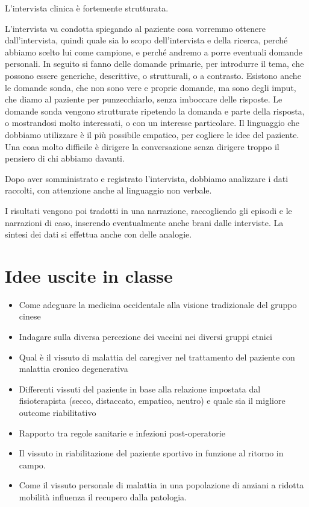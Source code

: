 L'intervista clinica è fortemente strutturata.

L'intervista va condotta spiegando al paziente cosa vorremmo ottenere dall'intervista, quindi quale sia lo scopo dell'intervista e della ricerca, perché abbiamo scelto lui come campione, e perché andremo a porre eventuali domande personali.
In seguito si fanno delle domande primarie, per introdurre il tema, che possono essere generiche, descrittive, o strutturali, o a contrasto. Esistono anche le domande sonda, che non sono vere e proprie domande, ma sono degli imput, che diamo al paziente per punzecchiarlo, senza imboccare delle risposte. Le domande sonda vengono strutturate ripetendo la domanda e parte della risposta, o mostrandosi molto interessati, o con un interesse particolare. Il linguaggio che dobbiamo utilizzare è il più possibile empatico, per cogliere le idee del paziente. Una coaa molto difficile è dirigere la conversazione senza dirigere troppo il pensiero di chi abbiamo davanti.

Dopo aver somministrato e registrato l'intervista, dobbiamo analizzare i dati raccolti, con attenzione anche al linguaggio non verbale.

I risultati vengono poi tradotti in una narrazione, raccogliendo gli episodi e le narrazioni di caso, inserendo eventualmente anche brani dalle interviste. La sintesi dei dati si effettua anche con delle analogie.

\section{Idee uscite in classe}
\begin{itemize}
\item Come adeguare la medicina occidentale alla visione tradizionale del gruppo cinese
\item Indagare sulla diversa percezione dei vaccini nei diversi gruppi etnici
\item Qual è il vissuto di malattia del caregiver nel trattamento del paziente con malattia cronico degenerativa
\item Differenti vissuti del paziente in base alla relazione impostata dal fisioterapista (secco, distaccato, empatico, neutro) e quale sia il migliore outcome riabilitativo
\item Rapporto tra regole sanitarie e infezioni post-operatorie
\item Il vissuto in riabilitazione del paziente sportivo in funzione al ritorno in campo.
\item Come il vissuto personale di malattia in una popolazione di anziani a ridotta mobilità influenza il recupero dalla patologia.
\end{itemize}